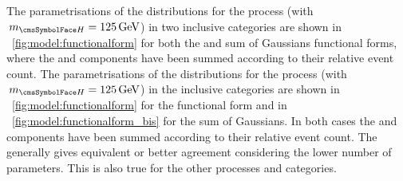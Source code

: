 \ifNewAnalysis
The parametrisations of the \mgg distributions for the \ggH process (with $\mH=125\GeV$) in two inclusive categories are shown in \Fig~\ref{fig:model:functionalform} for both the \DCBpG and sum of Gaussians functional forms, where the \RV and \WV components have been summed according to their relative event count. %
\else
The parametrisations of the \mgg distributions for the \ggH process (with $\mH=125\GeV$) in the inclusive categories are shown in \Fig~\ref{fig:model:functionalform} for the \DCBpG functional form and in \Fig~\ref{fig:model:functionalform_bis} for the sum of Gaussians. In both cases the \RV and \WV components have been summed according to their relative event count. %
\fi
The \DCBpG generally gives equivalent or better agreement considering the lower number of parameters. This is also true for the other processes and categories.

